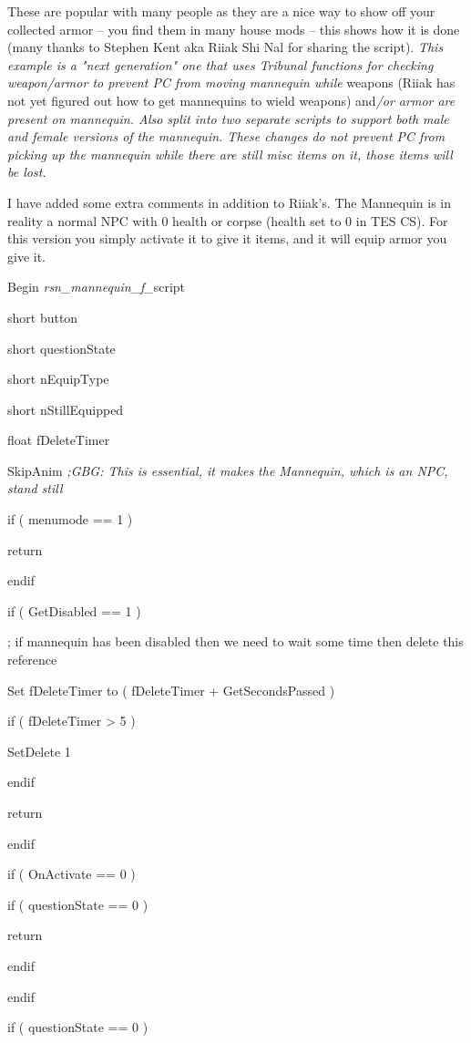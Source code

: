 \documentclass[
]{article}
\begin{document}
These are popular with many people as they are a nice way to show off
your collected armor -- you find them in many house mods -- this shows
how it is done (many thanks to Stephen Kent aka Riiak Shi Nal for
sharing the script). \emph{This example is a "next generation" one that
uses Tribunal functions for checking weapon/armor to prevent PC from
moving mannequin while} weapons (Riiak has not yet figured out how to
get mannequins to wield weapons) and\emph{/or armor are present on
mannequin. Also split into two separate scripts to support both male and
female versions of the mannequin. These changes do not prevent PC from
picking up the mannequin while there are still misc items on it, those
items will be lost.}

I have added some extra comments in addition to Riiak's. The Mannequin
is in reality a normal NPC with 0 health or corpse (health set to 0 in
TES CS). For this version you simply activate it to give it items, and
it will equip armor you give it.

Begin \emph{rsn\_mannequin\_f\_}script

short button

short questionState

short nEquipType

short nStillEquipped

float fDeleteTimer

SkipAnim \emph{;GBG: This is essential, it makes the Mannequin, which is
an NPC, stand still}

if ( menumode == 1 )

return

endif

if ( GetDisabled == 1 )

; if mannequin has been disabled then we need to wait some time then
delete this reference

Set fDeleteTimer to ( fDeleteTimer + GetSecondsPassed )

if ( fDeleteTimer \textgreater{} 5 )

SetDelete 1

endif

return

endif

if ( OnActivate == 0 )

if ( questionState == 0 )

return

endif

endif

if ( questionState == 0 )
\end{document}
